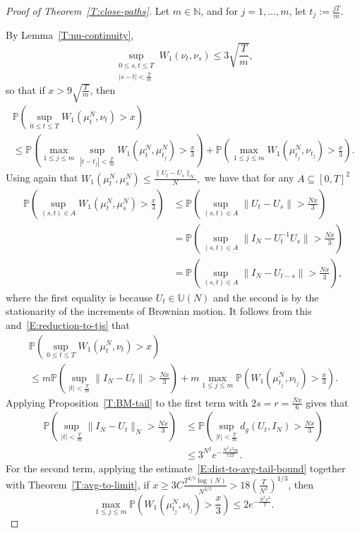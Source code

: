 \documentclass[11pt]{article}
\theoremstyle{definition}
\numberwithin{equation}{section}
\numberwithin{figure}{section}
\numberwithin{table}{section}
\newcommand{\Unitary}[1]{\mathbb{U}\left(#1\right)}
\newcommand{\Prob}{\mathbb{P}}
\newcommand{\N}{\mathbb{N}}
\begin{document}
\begin{proof}[Proof of Theorem~\ref{T:close-paths}]
Let $m\in\N$, and for $j=1,\ldots,m$, let $t_j:=\frac{jT}{m}$.



By Lemma~\ref{T:nu-continuity},
\[
\sup_{\substack{0\le s,t\le T\\
|s-t|<\frac{T}{m}}}W_1(\nu_t,\nu_s)\le 3\sqrt{\frac{T}{m}},
\]
so that if $x>9\sqrt{\frac{T}{m}}$, then
\begin{multline}\label{E:reduction-to-tjs}
\Prob\left(\sup_{0\le t\le T}W_1(\mu^N_t,\nu_t)>x\right)\\
\le \Prob\left(\max_{1\le j\le m}\sup_{|t-t_j|<\frac{T}{m}}W_1(\mu^N_t,\mu^N_{t_j})>\frac{x}{3}\right)+\Prob\left(\max_{1\le j\le m}W_1(\mu^N_{t_j},\nu_{t_j})>\frac{x}{3}\right).
\end{multline}
Using again that $W_1(\mu^N_t,\mu^N_s)\le\frac{\|U_t-U_s\|_N}{N},$ we have that for any $A\subseteq[0,T]^2$
\begin{align*}
\Prob\left(\sup_{(s,t)\in A}W_1(\mu^N_t,\mu^N_s)>\frac{x}{3}\right) &\le\Prob\left(\sup_{(s,t)\in A}\|U_t-U_s\|>\frac{Nx}{3}\right)\\
&=\Prob\left(\sup_{(s,t)\in A}\|I_N-U_t^{-1}U_s\|>\frac{Nx}{3}\right) \\
&=\Prob\left(\sup_{(s,t)\in A}\|I_N-U_{t-s}\|>\frac{Nx}{3}\right),
\end{align*}
where the first equality is because $U_t\in\Unitary{N}$ and the second is by the stationarity of the increments of Brownian motion. It follows from this and~\eqref{E:reduction-to-tjs} that
\begin{multline*}
\Prob\left(\sup_{0\le t\le
T}W_1(\mu^N_t,\nu_t)>x\right) \\
\le m\Prob\left(\sup_{|t|<\frac{T}{m}}\|I_N-U_t\|>\frac{Nx}{3}\right)+m\max_{1\le j\le m}\Prob\left(W_1(\mu^N_{t_j},\nu_{t_j})>\frac{x}{3}\right).
\end{multline*}
Applying Proposition~\ref{T:BM-tail} to the first term with $2s=r=\frac{Nx}{6}$ gives that
\begin{align*}
\Prob\left(\sup_{|t|<\frac{T}{m}}\|I_N-U_t\|_N>\frac{Nx}{3}\right) &\le \Prob\left(\sup_{|t|<\frac{T}{m}}d_g(U_t,I_N)>\frac{Nx}{3}\right) \\
&\le 3^{N^2}e^{-\frac{N^2x^2m}{72T}}.
\end{align*}
For the second term, applying the estimate~\eqref{E:dist-to-avg-tail-bound} together with Theorem~\ref{T:avg-to-limit}, if $x\ge 3C\frac{T^{2/5}\log(N)}{N^{2/5}}> 18\left(\frac{T}{N^2}\right)^{1/3}$, then
\[
\max_{1\le j\le m}\Prob\left(W_1(\mu^N_{t_j},\nu_{t_j})>\frac{x}{3}\right) \le 2e^{-\frac{N^2x^2}{T}}.
\]


\end{proof}
\end{document}

